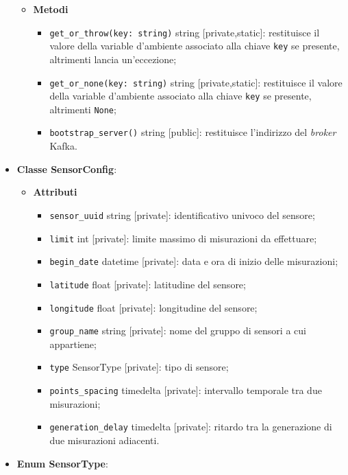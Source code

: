 \begin{itemize}
\begin{itemize}
		      \item \textbf{Metodi}
		            \begin{itemize}
			            \item \texttt{get\_or\_throw(key: string)} string [private,static]: restituisce il valore della variable d'ambiente associato alla chiave \texttt{key} se presente, altrimenti lancia un'eccezione;
			            \item \texttt{get\_or\_none(key: string)} string [private,static]: restituisce il valore della variable d'ambiente associato alla chiave \texttt{key} se presente, altrimenti \texttt{None};
			            \item \texttt{bootstrap\_server()} string [public]: restituisce l'indirizzo del \textit{broker} Kafka.
		            \end{itemize}
	      \end{itemize}
	\item \textbf{Classe SensorConfig}:
	      \begin{itemize}
		      \item \textbf{Attributi}
		            \begin{itemize}
			            \item \texttt{sensor\_uuid} string [private]: identificativo univoco del sensore;
			            \item \texttt{limit} int [private]: limite massimo di misurazioni da effettuare;
			            \item \texttt{begin\_date} datetime [private]: data e ora di inizio delle misurazioni;
			            \item \texttt{latitude} float [private]: latitudine del sensore;
			            \item \texttt{longitude} float [private]: longitudine del sensore;
			            \item \texttt{group\_name} string [private]: nome del gruppo di sensori a cui appartiene;
			            \item \texttt{type} SensorType [private]: tipo di sensore;
			            \item \texttt{points\_spacing} timedelta [private]: intervallo temporale tra due misurazioni;
			            \item \texttt{generation\_delay} timedelta [private]: ritardo tra la generazione di due misurazioni adiacenti.
		            \end{itemize}
	      \end{itemize}
	\item \textbf{Enum SensorType}:

\end{itemize}
